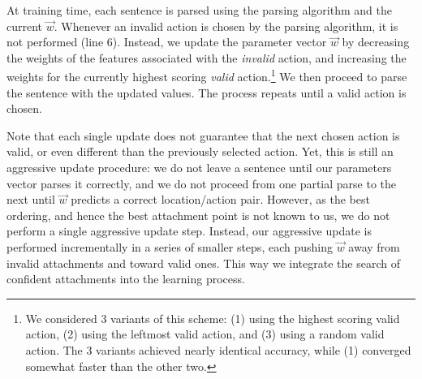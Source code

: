 \documentclass[11pt]{article}
\begin{document}
   At training time, each sentence is parsed using the parsing algorithm and the current $\vec{w}$.  Whenever an invalid action is chosen by the parsing algorithm, it is not performed (line 6).  Instead, we update the parameter vector $\vec{w}$ by decreasing the weights of the features associated with the \textit{invalid} action, and increasing the weights for the currently highest scoring \textit{valid} action.\footnote{ We considered 3 variants of this scheme: (1) using the highest scoring valid action, (2) using the leftmost valid action, and (3) using a random valid action.  The 3 variants achieved nearly identical accuracy, while (1) converged somewhat faster than the other two.}
   We then proceed to parse the sentence with the updated values.  The process repeats until a valid action is chosen.  

   Note that each single update does not guarantee that the next chosen action is valid, or even different than the previously selected action.  Yet,  this is still an aggressive update procedure: we do not leave a sentence until our parameters vector parses it correctly, and we do not proceed from one partial parse to the next until $\vec{w}$ predicts a correct location/action pair.  However, as the best ordering, and hence the best attachment point is not known to us, we do not perform a single aggressive update step.  Instead, our aggressive update is performed incrementally in a series of smaller steps, each pushing $\vec{w}$ away from invalid attachments and toward valid ones. This way we integrate the search of confident attachments into the learning process.
\end{document}
